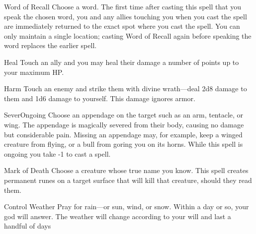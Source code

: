 \documentclass[8pt]{extarticle}
\begin{document}

\begin{multicols}{2}
\begin{aspell}{Word of Recall}{}
  Choose a word. The first time after casting this spell that you
  speak the chosen word, you and any allies touching you when you cast
  the spell are immediately returned to the exact spot where you cast
  the spell. You can only maintain a single location; casting Word of
  Recall again before speaking the word replaces the earlier spell.
\end{aspell}

\begin{aspell}{Heal}{}
  Touch an ally and you may heal their damage a number of points up to
  your maximum HP.
\end{aspell}

\begin{aspell}{Harm}{}
  Touch an enemy and strike them with divine wrath—deal 2d8 damage to
  them and 1d6 damage to yourself. This damage ignores armor.
\end{aspell}
\vfill\null
\columnbreak

\begin{aspell}{Sever}{Ongoing}
  Choose an appendage on the target such as an arm, tentacle, or
  wing. The appendage is magically severed from their body, causing no
  damage but considerable pain. Missing an appendage may, for example,
  keep a winged creature from flying, or a bull from goring you on its
  horns. While this spell is ongoing you take -1 to cast a spell.
\end{aspell}

\begin{aspell}{Mark of Death}{}
  Choose a creature whose true name you know. This spell creates
  permanent runes on a target surface that will kill that creature,
  should they read them.
\end{aspell}

\begin{aspell}{Control Weather}{}
Pray for rain—or sun, wind, or snow. Within a day or so, your god will answer.
The weather will change according to your will and last a handful of days
\end{aspell}
\vfill\null
\end{multicols}

\end{document}
